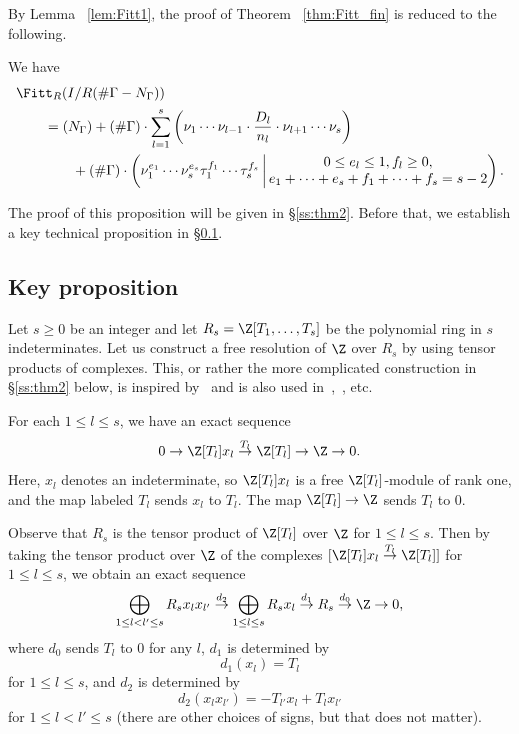 By Lemma ~\ref{lem:Fitt1}, the proof of Theorem ~\ref{thm:Fitt_fin} is reduced to the following.

\begin{prop}\label{prop:Fitt_fin2}
We have
\begin{align}
& \Fitt_{R}(I/R(\# \Gamma - N_{\Gamma}))\\
& \qquad = 
	(N_{\Gamma})
	+ (\# \Gamma) \cdot \sum_{l=1}^s \left( \nu_1 \cdots \nu_{l-1} \cdot \frac{D_l}{n_l} \cdot \nu_{l+1} \cdots \nu_s \right) \\
& \qquad \qquad + (\# \Gamma) \cdot \left( \nu_1^{e_1} \cdots \nu_s^{e_s} \tau_1^{f_1} \cdots \tau_s^{f_s} \, \middle| \, \begin{matrix} 0 \leq e_l \leq 1, f_l \geq 0, \\ e_1 + \cdots + e_s + f_1 + \cdots + f_s = s- 2 \end{matrix} \right).
\end{align}
\end{prop}

The proof of this proposition will be given in \S\ref{ss:thm2}.
Before that, we establish a key technical proposition in \S\ref{ss:resol}.

\subsection{Key proposition}\label{ss:resol}

Let $s \geq 0$ be an integer and let $R_s = \Z[T_1, \dots, T_s]$ be the polynomial ring in $s$ indeterminates.
Let us construct a free resolution of $\Z$ over $R_s$ by using tensor products of complexes.
This, or rather the more complicated construction in \S\ref{ss:thm2} below, is inspired by~\cite{GK15} and is also used in~\cite{Kata_05},~\cite{AK21}, etc.

For each $1 \leq l \leq s$, we have an exact sequence
\[
0 \to \Z[T_l] x_l \overset{T_l}{\to} \Z[T_l] \to \Z \to 0.
\]
Here, $x_l$ denotes an indeterminate, so $\Z[T_l] x_l$ is a free $\Z[T_l]$-module of rank one, and the map labeled $T_l$ sends $x_l$ to $T_l$.
The map $\Z[T_l] \to \Z$ sends $T_l$ to $0$.

Observe that $R_s$ is the tensor product of $\Z[T_l]$ over $\Z$ for $1 \leq l \leq s$.
Then by taking the tensor product over $\Z$ of the complexes $[\Z[T_l] x_l \overset{T_l}{\to} \Z[T_l]]$ for $1 \leq l \leq s$, we obtain an exact sequence
\[
\bigoplus_{1 \leq l < l' \leq s} R_s x_l x_{l'} \overset{d_2}{\to} \bigoplus_{1 \leq l \leq s} R_s x_l \overset{d_1}{\to} R_s \overset{d_0}{\to} \Z \to 0,
\]
where $d_0$ sends $T_l$ to $0$ for any $l$, $d_1$ is determined by 
\[
d_1(x_l) = T_l
\]
for $1 \leq l \leq s$, and $d_2$ is determined by
\[
d_2(x_l x_{l'}) = - T_{l'} x_l + T_l x_{l'}
\]
for $1 \leq l < l' \leq s$ (there are other choices of signs, but that does not matter).

